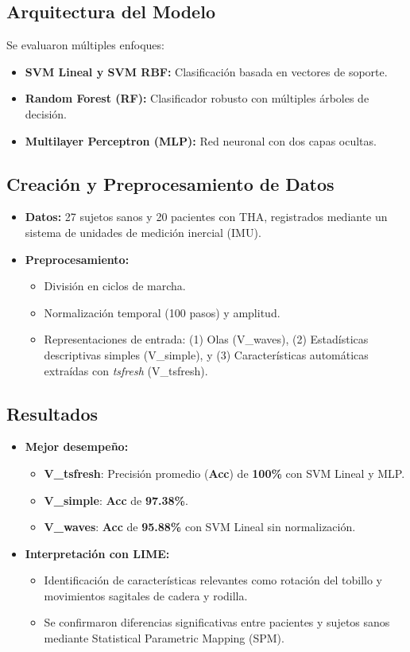 \documentclass{report}
\begin{document}
\subsection{Arquitectura del Modelo}
Se evaluaron múltiples enfoques:
\begin{itemize}
    \item \textbf{SVM Lineal y SVM RBF:} Clasificación basada en vectores de soporte.
    \item \textbf{Random Forest (RF):} Clasificador robusto con múltiples árboles de decisión.
    \item \textbf{Multilayer Perceptron (MLP):} Red neuronal con dos capas ocultas.
\end{itemize}

\subsection{Creación y Preprocesamiento de Datos}
\begin{itemize}
    \item \textbf{Datos:} 27 sujetos sanos y 20 pacientes con THA, registrados mediante un sistema de unidades de medición inercial (IMU).
    \item \textbf{Preprocesamiento:} 
    \begin{itemize}
        \item División en ciclos de marcha.
        \item Normalización temporal (100 pasos) y amplitud.
        \item Representaciones de entrada: (1) Olas (V\_waves), (2) Estadísticas descriptivas simples (V\_simple), y (3) Características automáticas extraídas con \textit{tsfresh} (V\_tsfresh).
    \end{itemize}
\end{itemize}

\subsection{Resultados}
\begin{itemize}
    \item \textbf{Mejor desempeño:} 
    \begin{itemize}
        \item \textbf{V\_tsfresh}: Precisión promedio (\textbf{Acc}) de \textbf{100\%} con SVM Lineal y MLP.
        \item \textbf{V\_simple}: \textbf{Acc} de \textbf{97.38\%}.
        \item \textbf{V\_waves}: \textbf{Acc} de \textbf{95.88\%} con SVM Lineal sin normalización.
    \end{itemize}
    \item \textbf{Interpretación con LIME:}
    \begin{itemize}
        \item Identificación de características relevantes como rotación del tobillo y movimientos sagitales de cadera y rodilla.
        \item Se confirmaron diferencias significativas entre pacientes y sujetos sanos mediante Statistical Parametric Mapping (SPM).
    \end{itemize}
\end{itemize}
\end{document}
